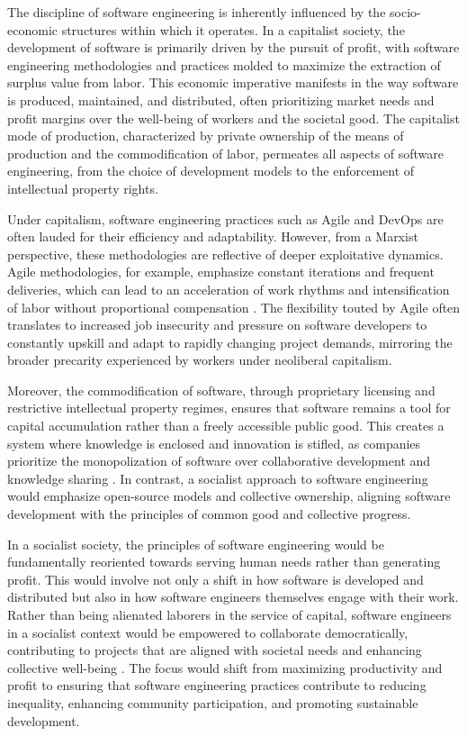 \begin{refsection}
The discipline of software engineering is inherently influenced by the socio-economic structures within which it operates. In a capitalist society, the development of software is primarily driven by the pursuit of profit, with software engineering methodologies and practices molded to maximize the extraction of surplus value from labor. This economic imperative manifests in the way software is produced, maintained, and distributed, often prioritizing market needs and profit margins over the well-being of workers and the societal good. The capitalist mode of production, characterized by private ownership of the means of production and the commodification of labor, permeates all aspects of software engineering, from the choice of development models to the enforcement of intellectual property rights.

Under capitalism, software engineering practices such as Agile and DevOps are often lauded for their efficiency and adaptability. However, from a Marxist perspective, these methodologies are reflective of deeper exploitative dynamics. Agile methodologies, for example, emphasize constant iterations and frequent deliveries, which can lead to an acceleration of work rhythms and intensification of labor without proportional compensation \cite[pp.~103-105]{marxCapital2008}. The flexibility touted by Agile often translates to increased job insecurity and pressure on software developers to constantly upskill and adapt to rapidly changing project demands, mirroring the broader precarity experienced by workers under neoliberal capitalism.

Moreover, the commodification of software, through proprietary licensing and restrictive intellectual property regimes, ensures that software remains a tool for capital accumulation rather than a freely accessible public good. This creates a system where knowledge is enclosed and innovation is stifled, as companies prioritize the monopolization of software over collaborative development and knowledge sharing \cite[pp.~225-230]{engelsAntiDühring1966}. In contrast, a socialist approach to software engineering would emphasize open-source models and collective ownership, aligning software development with the principles of common good and collective progress.

In a socialist society, the principles of software engineering would be fundamentally reoriented towards serving human needs rather than generating profit. This would involve not only a shift in how software is developed and distributed but also in how software engineers themselves engage with their work. Rather than being alienated laborers in the service of capital, software engineers in a socialist context would be empowered to collaborate democratically, contributing to projects that are aligned with societal needs and enhancing collective well-being \cite[pp.~360-365]{marxEconomic2018}. The focus would shift from maximizing productivity and profit to ensuring that software engineering practices contribute to reducing inequality, enhancing community participation, and promoting sustainable development.


\end{refsection}
